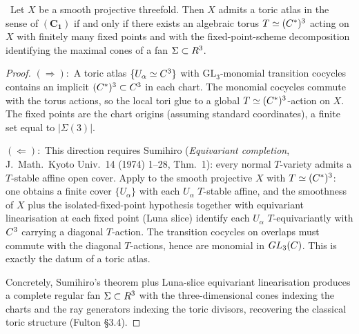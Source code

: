 \begin{proposition}
\label{prop:sumihiro-biconditional}
\ClaimStatusProposition\
Let $X$ be a smooth projective threefold. Then $X$ admits a toric
atlas in the sense of $(\mathbf{C_1})$ if and only if there exists an
algebraic torus $T \simeq (C^\ast)^3$ acting on $X$ with finitely
many fixed points and with the fixed-point-scheme decomposition
identifying the maximal cones of a fan $\Sigma \subset R^3$.
\end{proposition}

\begin{proof}
\emph{$(\Rightarrow)$}:\ A toric atlas $\{U_\alpha \simeq C^3\}$
with $\mathrm{GL}_3$-monomial transition cocycles contains an implicit
$(C^\ast)^3 \subset C^3$ in each chart. The monomial cocycles
commute with the torus actions, so the local tori glue to a global
$T \simeq (C^\ast)^3$-action on $X$. The fixed points are the chart
origins (assuming standard coordinates), a finite set equal to
$|\Sigma(3)|$.

\emph{$(\Leftarrow)$}:\ This direction requires Sumihiro
(\emph{Equivariant completion}, J.\ Math.\ Kyoto Univ.\ 14 (1974)
1--28, Thm.~1): every normal $T$-variety admits a $T$-stable affine
open cover. Apply to the smooth projective $X$ with $T \simeq
(C^\ast)^3$: one obtains a finite cover $\{U_\alpha\}$ with each
$U_\alpha$ $T$-stable affine, and the smoothness of $X$ plus the
isolated-fixed-point hypothesis together with equivariant linearisation
at each fixed point (Luna slice) identify each $U_\alpha$
$T$-equivariantly with $C^3$ carrying a diagonal $T$-action. The
transition cocycles on overlaps must commute with the diagonal
$T$-actions, hence are monomial in $GL_3(C)$. This is
exactly the datum of a toric atlas.

Concretely, Sumihiro's theorem plus Luna-slice equivariant linearisation
produces a complete regular fan $\Sigma \subset R^3$ with the three-dimensional
cones indexing the charts and the ray generators indexing the toric
divisors, recovering the classical toric structure (Fulton \S3.4).
\end{proof}


